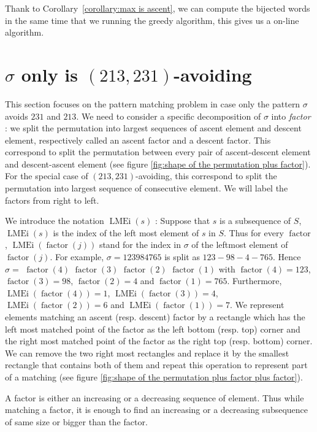 \documentclass[a4paper]{llncs}
\DeclareMathOperator{\LMEi}{LMEi}
\DeclareMathOperator{\factor}{factor}
\begin{document}
Thank to Corollary~\ref{corollary:max is ascent},
we can compute the bijected words in the same time that we running the greedy algorithm, this gives us a on-line algorithm.



\section{$\sigma$ only is $(213,231)$-avoiding}
\label{section:sigma only avoid 231 and 213}

This section focuses on the pattern matching problem
in case only the pattern $\sigma$ avoids $231$ and $213$.
We need to consider a specific decomposition of $\sigma$ into \textit{factor} :
we split the permutation into largest sequences of ascent element and descent element, respectively called an ascent factor and a descent factor.
This correspond to split the permutation between every pair of ascent-descent element and descent-ascent element (see figure \ref{fig:shape of the permutation plus factor}).
For the special case of $(213,231)$-avoiding, this correspond to split the permutation into largest sequence of consecutive element.
We will label the factors from right to left.

We introduce the notation $\LMEi(s)$ : Suppose that $s$ is a subsequence of $S$, $\LMEi(s)$ is the index of the left most element of $s$ in $S$. Thus
for every $\factor$, $\LMEi(\factor(j))$ stand for the index in $\sigma$
of the leftmost element of $\factor(j)$.
For example,
$\sigma = 123984765$ is split as
 $123-98-4-765$. 
Hence
$\sigma =$ $\factor(4)$ $\factor(3)$ $\factor(2)$ $\factor(1)$ with
$\factor(4) =123$, $\factor(3) = 98$, $\factor(2) = 4$ and $\factor(1) = 765$.
Furthermore,
$\LMEi(\factor(4)) = 1$, $\LMEi(\factor(3)) = 4$, $\LMEi(\factor(2)) = 6$ and $\LMEi(\factor(1)) = 7$.
We represent elements matching an ascent (resp. descent) factor 
by a rectangle which has the left most matched point of the factor as the left bottom (resp. top) corner and the right most matched point of the factor as the right top (resp. bottom) corner.
We can remove the two right most rectangles and replace it by the smallest rectangle that contains both of them and repeat this operation to represent part of a matching (see figure \ref{fig:shape of the permutation plus factor plus factor}).

\begin{remark}
A factor is either an increasing or a decreasing sequence of element. Thus while matching a factor, it is enough to find an increasing or a decreasing subsequence of same size or bigger than the factor.
\end{remark}
\end{document}
